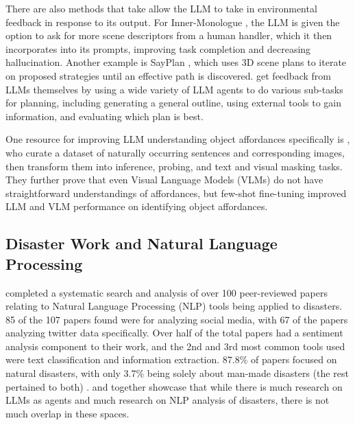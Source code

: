 There are also methods that take allow the LLM to take in environmental feedback in response to its output. For Inner-Monologue \cite{innermono}, the LLM is given the option to ask for more scene descriptors from a human handler, which it then incorporates into its prompts, improving task completion and decreasing hallucination. Another example is SayPlan \cite{sayplan}, which uses 3D scene plans to iterate on proposed strategies until an effective path is discovered. \citet{humanplan} get feedback from LLMs themselves by using a wide variety of LLM agents to do various sub-tasks for planning, including generating a general outline, using external tools to gain information, and evaluating which plan is best. 

One resource for improving LLM understanding object affordances specifically is \citet{Text2Afford}, who curate a dataset of naturally occurring sentences and corresponding images, then transform them into inference, probing, and text and visual masking tasks. They further prove that even Visual Language Models (VLMs) do not have straightforward understandings of affordances, but few-shot fine-tuning improved LLM and VLM performance on identifying object affordances.

\subsection{Disaster Work and Natural Language Processing}
\citet{LLMdisaster} completed a systematic search and analysis of over 100 peer-reviewed papers relating to Natural Language Processing (NLP) tools being applied to disasters. 85 of the 107 papers found were for analyzing social media, with 67 of the papers analyzing twitter data specifically. Over half of the total papers had a sentiment analysis component to their work, and the 2nd and 3rd most common tools used were text classification and information extraction. 87.8\% of papers focused on natural disasters, with only 3.7\% being solely about man-made disasters (the rest pertained to both) \cite{LLMdisaster}. \citet{LLMdisaster} and \cite{agentsLLM} together showcase that while there is much research on LLMs as agents and much research on NLP analysis of disasters, there is not much overlap in these spaces.